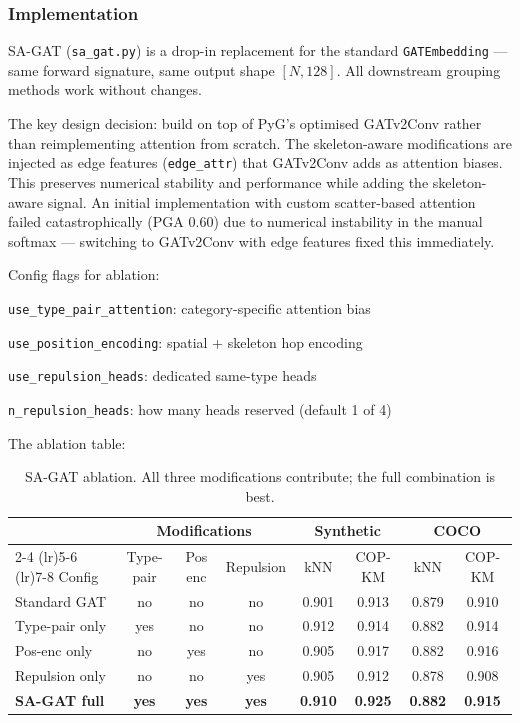 \subsubsection{Implementation}

SA-GAT (\texttt{sa\_gat.py}) is a drop-in replacement for the standard \texttt{GATEmbedding} --- same forward signature, same output shape $[N, 128]$. All downstream grouping methods work without changes.

The key design decision: build on top of PyG's optimised GATv2Conv rather than reimplementing attention from scratch. The skeleton-aware modifications are injected as edge features (\texttt{edge\_attr}) that GATv2Conv adds as attention biases. This preserves numerical stability and performance while adding the skeleton-aware signal. An initial implementation with custom scatter-based attention failed catastrophically (PGA 0.60) due to numerical instability in the manual softmax --- switching to GATv2Conv with edge features fixed this immediately.

Config flags for ablation:
\begin{compactitem}
  \item \texttt{use\_type\_pair\_attention}: category-specific attention bias
  \item \texttt{use\_position\_encoding}: spatial + skeleton hop encoding
  \item \texttt{use\_repulsion\_heads}: dedicated same-type heads
  \item \texttt{n\_repulsion\_heads}: how many heads reserved (default 1 of 4)
\end{compactitem}

The ablation table:

\begin{table}[H]
\centering
\footnotesize
\begin{tabular}{lccccccc}
\toprule
 & \multicolumn{3}{c}{Modifications} & \multicolumn{2}{c}{Synthetic} & \multicolumn{2}{c}{COCO} \\
\cmidrule(lr){2-4} \cmidrule(lr){5-6} \cmidrule(lr){7-8}
Config & Type-pair & Pos enc & Repulsion & kNN & COP-KM & kNN & COP-KM \\
\midrule
Standard GAT & no & no & no & 0.901 & 0.913 & 0.879 & 0.910 \\
Type-pair only & yes & no & no & 0.912 & 0.914 & 0.882 & 0.914 \\
Pos-enc only & no & yes & no & 0.905 & 0.917 & 0.882 & 0.916 \\
Repulsion only & no & no & yes & 0.905 & 0.912 & 0.878 & 0.908 \\
\textbf{SA-GAT full} & \textbf{yes} & \textbf{yes} & \textbf{yes} & \textbf{0.910} & \textbf{0.925} & \textbf{0.882} & \textbf{0.915} \\
\bottomrule
\end{tabular}
\caption{SA-GAT ablation. All three modifications contribute; the full combination is best.}
\end{table}


